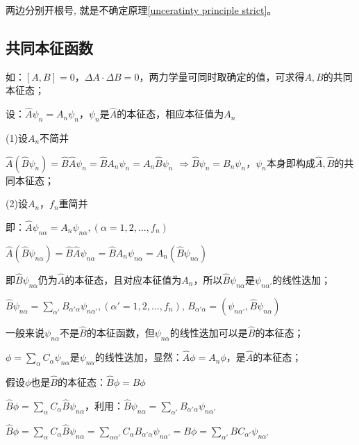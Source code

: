 两边分别开根号, 就是不确定原理\ref{unceratinty principle strict}。


\subsection{共同本征函数}


如：$\left[ {A,B} \right] = 0$，$\Delta A \cdot \Delta B = 0$，两力学量可同时取确定的值，可求得$A,B$的共同本征态；


设：$\hat A\psi _n  = A_n \psi _n $，$\psi _n$是$\hat A$的本征态，相应本征值为$A_n$

(1)设$A_n$不简并

$\hat A\left( {\hat B\psi _n } \right) = \hat B\hat A\psi _n  = \hat B A_n \psi _n  = A_n \hat B\psi _n $
$ \Rightarrow \hat B\psi _n  = B_n \psi _n $，$\psi _n$本身即构成$\hat A, \hat B$的共同本征态；

(2)设$A_n$，$f_n$重简并

即：$\hat A\psi _{n\alpha }  = A_n \psi _{n\alpha } ,(\alpha  = 1,2,...,f_n )$

$\hat A\left( {\hat B\psi _{n\alpha } } \right) = \hat B\hat A\psi _{n\alpha }  = \hat BA_n \psi _{n\alpha }  = A_n \left( {\hat B\psi _{n\alpha } } \right)$

即$\hat B\psi _{n\alpha } $仍为$\hat A$的本征态，且对应本征值为$A_n$，所以$\hat B\psi _{n\alpha } $是$\psi _{n\alpha '} $的线性迭加；

$\hat B\psi _{n\alpha }  = \sum\limits_{\alpha '} {B_{\alpha '\alpha } \psi _{n\alpha '} } ,(\alpha ' = 1,2,...,f_n )$, $B_{\alpha '\alpha }  = \left( {\psi _{n\alpha '} ,\hat B\psi _{n\alpha } } \right)$

一般来说$\psi _{n\alpha } $不是$\hat B$的本征函数，但$\psi _{n\alpha } $的线性迭加可以是$\hat B$的本征态；


$\phi  = \sum\limits_\alpha  {C_\alpha  \psi _{n\alpha } } $是$\psi _{n\alpha } $的线性迭加，显然：$\hat A\phi  = A_n \phi $，是$\hat A$的本征态；

假设$\phi$也是$\hat B$的本征态：$\hat B\phi  = B\phi $

$\hat B\phi  = \sum\limits_\alpha  {C_\alpha  \hat B\psi _{n\alpha } } $，利用：$\hat B\psi _{n\alpha }  = \sum\limits_{\alpha '} {B_{\alpha '\alpha } \psi _{n\alpha '} } $

$\hat B\phi  = \sum\limits_\alpha  {C_\alpha  \hat B\psi _{n\alpha } }  = \sum\limits_{\alpha \alpha '} {C_\alpha  B_{\alpha '\alpha } \psi _{n\alpha '} }  = B\phi  = \sum\limits_{\alpha '} {BC_{\alpha '} \psi _{n\alpha '} } $



